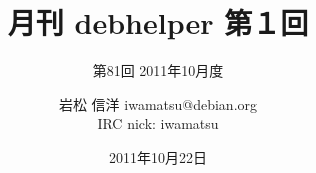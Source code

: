 




\documentclass[cjk,dvipdfmx,12pt]{beamer}
\usepackage{monthlypresentation}



\title{月刊 debhelper 第１回}
\subtitle{第81回 2011年10月度}
\author{岩松 信洋 iwamatsu@debian.org\\IRC nick: iwamatsu}
\date{2011年10月22日}



